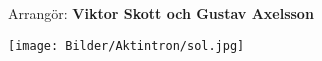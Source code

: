 \vspace*{\fill}
\begin{center}{\large Arrangör: \textbf{Viktor Skott och Gustav Axelsson}}\end{center}
\begin{center}\texttt{[image: Bilder/Aktintron/sol.jpg]}
\end{center}

\vspace*{\fill}
\newpage
\begingroup\fontsize{11}{12}\selectfont %
\endgroup
\newpage
\begingroup\fontsize{10}{12}\selectfont
\endgroup
\newpage
\begingroup\fontsize{11}{12}\selectfont
{}
\endgroup
